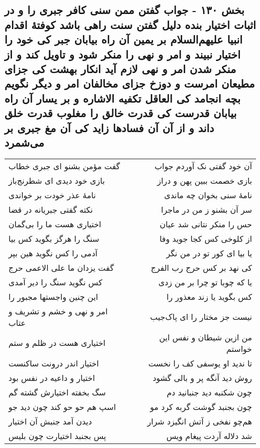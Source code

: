 \begin{center}
\section*{بخش ۱۳۰ - جواب گفتن ممن سنی کافر جبری  را و در اثبات اختیار بنده دلیل گفتن سنت راهی باشد کوفتهٔ اقدام انبیا علیهم‌السلام بر یمین آن راه بیابان جبر کی خود را اختیار نبیند و امر و نهی را منکر شود و تاویل کند و از منکر شدن امر و نهی لازم آید انکار بهشت کی جزای مطیعان امرست و دوزخ جزای مخالفان امر و دیگر نگویم بچه انجامد کی العاقل تکفیه الاشاره و بر یسار آن راه بیابان قدرست کی قدرت خالق را مغلوب قدرت خلق داند و از آن آن فسادها زاید کی آن مغ جبری بر می‌شمرد}
\label{sec:sh130}
\begin{longtable}{l p{0.5cm} r}
گفت مؤمن بشنو ای جبری خطاب
&&
آن خود گفتی نک آوردم جواب
\\
بازی خود دیدی ای شطرنج‌باز
&&
بازی خصمت ببین پهن و دراز
\\
نامهٔ عذر خودت بر خواندی
&&
نامهٔ سنی بخوان چه ماندی
\\
نکته گفتی جبریانه در قضا
&&
سر آن بشنو ز من در ماجرا
\\
اختیاری هست ما را بی‌گمان
&&
حس را منکر نتانی شد عیان
\\
سنگ را هرگز بگوید کس بیا
&&
از کلوخی کس کجا جوید وفا
\\
آدمی را کس نگوید هین بپر
&&
یا بیا ای کور تو در من نگر
\\
گفت یزدان ما علی الاعمی حرج
&&
کی نهد بر کس حرج رب الفرج
\\
کس نگوید سنگ را دیر آمدی
&&
یا که چوبا تو چرا بر من زدی
\\
این چنین واجستها مجبور را
&&
کس بگوید یا زند معذور را
\\
امر و نهی و خشم و تشریف و عتاب
&&
نیست جز مختار را ای پاک‌جیب
\\
اختیاری هست در ظلم و ستم
&&
من ازین شیطان و نفس این خواستم
\\
اختیار اندر درونت ساکنست
&&
تا ندید او یوسفی کف را نخست
\\
اختیار و داعیه در نفس بود
&&
روش دید آنگه پر و بالی گشود
\\
سگ بخفته اختیارش گشته گم
&&
چون شکنبه دید جنبانید دم
\\
اسپ هم حو حو کند چون دید جو
&&
چون بجنبد گوشت گربه کرد مو
\\
دیدن آمد جنبش آن اختیار
&&
هم‌چو نفخی ز آتش انگیزد شرار
\\
پس بجنبد اختیارت چون بلیس
&&
شد دلاله آردت پیغام ویس
\\

\end{longtable}
\end{center}
